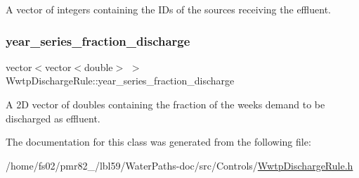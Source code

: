 A vector of integers containing the I\+Ds of the sources receiving the effluent. 

\mbox{\label{classWwtpDischargeRule_a5d193e0cbc2eb23e1b86e79fb2eafad3}} 
\subsubsection{\texorpdfstring{year\+\_\+series\+\_\+fraction\+\_\+discharge}{year\_series\_fraction\_discharge}}
{\footnotesize\ttfamily vector$<$vector$<$double$>$ $>$ Wwtp\+Discharge\+Rule\+::year\+\_\+series\+\_\+fraction\+\_\+discharge}



A 2D vector of doubles containing the fraction of the week\textquotesingle{}s demand to be discharged as effluent. 



The documentation for this class was generated from the following file\+:\begin{DoxyCompactItemize}
\item 
/home/fs02/pmr82\+\_/lbl59/\+Water\+Paths-\/doc/src/\+Controls/\mbox{\hyperlink{WwtpDischargeRule_8h}{Wwtp\+Discharge\+Rule.\+h}}\end{DoxyCompactItemize}
